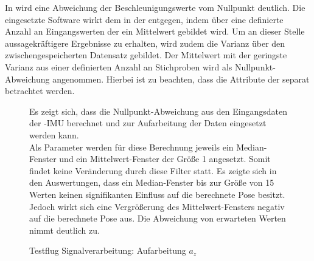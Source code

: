 

In  wird eine Abweichung der Beschleunigungswerte vom Nullpunkt deutlich. Die eingesetzte Software wirkt dem in der  entgegen, indem über eine definierte Anzahl an Eingangswerten der  ein Mittelwert gebildet wird. Um an dieser Stelle aussagekräftigere Ergebnisse zu erhalten, wird zudem die Varianz über den zwischengespeicherten Datensatz gebildet. Der Mittelwert mit der geringste Varianz aus einer definierten Anzahl an Stichproben wird als Nullpunkt-Abweichung angenommen. Hierbei ist zu beachten, dass die Attribute der  separat betrachtet werden.

\begin{figure}[ht!]
\vspace{0.25cm}
\begin{center}
\caption{Testflug Signalverarbeitung: Aufarbeitung $a_z$}
\label{fig:FlightStatusaz}
\end{center}

\vspace{0.25cm}
Es zeigt sich, dass die Nullpunkt-Abweichung aus den Eingangsdaten der \Quad-IMU berechnet und zur Aufarbeitung der Daten eingesetzt werden kann.\\
Als Parameter werden für diese Berechnung jeweils ein Median-Fenster und ein Mittelwert-Fenster der Größe 1 angesetzt. Somit findet keine Veränderung durch diese Filter statt. Es zeigte sich in den Auswertungen, dass ein Median-Fenster bis zur Größe von 15 Werten keinen signifikanten Einfluss auf die berechnete Pose besitzt. Jedoch wirkt sich eine Vergrößerung des Mittelwert-Fensters negativ auf die berechnete Pose aus. Die Abweichung von erwarteten Werten nimmt deutlich zu.
\end{figure}



